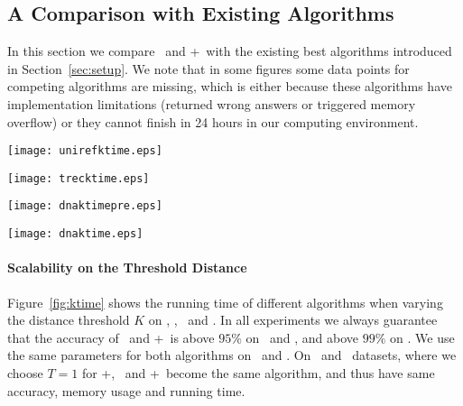 \subsection{A Comparison with Existing Algorithms}
\label{sec:comparison}

In this section we compare \ebdjoin\ and \ebdjoin+\ with the existing best algorithms introduced in Section~\ref{sec:setup}.  
We note that in some figures some data points for competing algorithms are missing, which is either because these algorithms have implementation limitations (returned wrong answers or triggered memory overflow) or they cannot finish in 24 hours in our computing environment.  


\begin{figure*}[!t]
\centering
\begin{minipage}[d]{0.4\linewidth}
\centering
\texttt{[image: unirefktime.eps]}
\centerline{\uniref}
\end{minipage}
\begin{minipage}[d]{0.4\linewidth}
\centering
\texttt{[image: trecktime.eps]}
\centerline{\trec}
\end{minipage}
\begin{minipage}[d]{0.4\linewidth}
\centering
\texttt{[image: dnaktimepre.eps]}
\centerline{\genoaa}
\end{minipage}
\begin{minipage}[d]{0.4\linewidth}
\centering
\texttt{[image: dnaktime.eps]}
\centerline{\genoa}
\end{minipage}
\caption{Running time, varying $K$.  Percentages on the curves for \ebdjoin/\ebdjoin+\ are their accuracy
}
\label{fig:ktime}
\end{figure*}



\paragraph{Scalability on the Threshold Distance}
Figure~\ref{fig:ktime} shows the running time of different algorithms when varying the distance threshold $K$ on \uniref, \trec, \genoaa\ and \genoa.   In all experiments we always guarantee that the accuracy of  \ebdjoin\ and \ebdjoin+\ is above $95\%$ on \uniref\ and \trec, and above $99\%$ on \genoaa. We use the same parameters for both algorithms on \genoa\ and \genoaa.  On \uniref\ and \trec\ datasets, where we choose $T = 1$ for \ebdjoin+, \ebdjoin\ and \ebdjoin+\ become the same algorithm, and thus have same accuracy, memory usage and running time.

